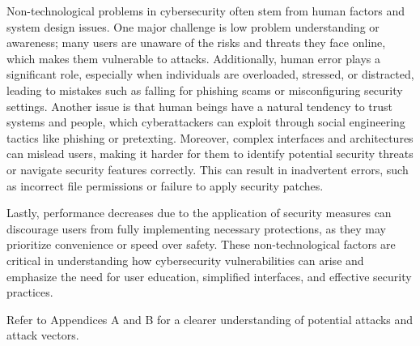 Non-technological problems in cybersecurity often stem from human factors and system design issues. One major challenge is low problem understanding or awareness; many users are unaware of the risks and threats they face online, which makes them vulnerable to attacks. Additionally, human error plays a significant role, especially when individuals are overloaded, stressed, or distracted, leading to mistakes such as falling for phishing scams or misconfiguring security settings. Another issue is that human beings have a natural tendency to trust systems and people, which cyberattackers can exploit through social engineering tactics like phishing or pretexting. Moreover, complex interfaces and architectures can mislead users, making it harder for them to identify potential security threats or navigate security features correctly. This can result in inadvertent errors, such as incorrect file permissions or failure to apply security patches.

Lastly, performance decreases due to the application of security measures can discourage users from fully implementing necessary protections, as they may prioritize convenience or speed over safety. These non-technological factors are critical in understanding how cybersecurity vulnerabilities can arise and emphasize the need for user education, simplified interfaces, and effective security practices.

\hfill 
\begin{center}
    Refer to Appendices A and B for a clearer understanding of potential attacks and attack vectors.
\end{center}
\hfill

